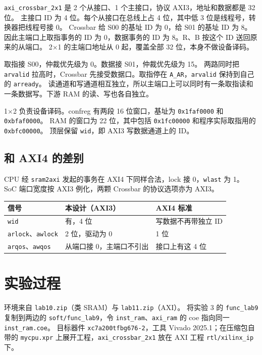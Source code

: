 \documentclass{article}
\begin{document}
\texttt{axi\_crossbar\_2x1} 是 2 个从接口、1 个主接口，协议 AXI3，地址和数据都是 32 位。
主接口 ID 为 4 位。每个从接口在总线上占 4 位，其中低 3 位是线程号，转换器把线程号接 0。
Crossbar 给 S00 的基址 ID 为 0，给 S01 的基址 ID 为 8。
因此主端口上取指事务的 ID 为 0，数据事务的 ID 为 8。R、B 按这个 ID 送回原来的从端口。
2$\times$1 的主端口地址从 0 起，覆盖全部 32 位，本身不做设备译码。

取指接 S00，仲裁优先级为 0。数据接 S01，仲裁优先级为 15。
两路同时把 \texttt{arvalid} 拉高时，Crossbar 先接受数据口。取指停在 \texttt{A\_AR}，\texttt{arvalid} 保持到自己的 \texttt{arready}。
读通道和写通道相互独立，所以主端口上可以同时有一条取指读和一条数据写。下游 RAM 的读、写也各自独立。

1$\times$2 负责设备译码。confreg 有两段 16 位窗口，基址为 \texttt{0x1faf0000} 和 \texttt{0xbfaf0000}。
RAM 的窗口为 22 位，其中包括 \texttt{0x1fc00000} 和程序实际取指用的 \texttt{0xbfc00000}。
顶层保留 \texttt{wid}，即 AXI3 写数据通道上的 ID。

\subsection{和 AXI4 的差别}
CPU 经 \texttt{sram2axi} 发起的事务在 AXI4 下同样合法，lock 接 0，\texttt{wlast} 为 1。
SoC 端口宽度按 AXI3 例化，两颗 Crossbar 的协议选项亦为 AXI3。

\begin{center}
\small
\begin{tabular}{@{}p{}p{}p{}@{}}
\toprule
信号 & 本设计（AXI3） & AXI4 标准 \\
\midrule
\texttt{wid} & 有，4 位 & 写数据不再带独立 ID \\
\texttt{arlock}、\texttt{awlock} & 2 位，驱动为 0 & 1 位 \\
\texttt{arqos}、\texttt{awqos} & 从端口接 0，主端口不引出 & 接口上有这 4 位 \\
\bottomrule
\end{tabular}
\end{center}

\section{实验过程}
环境来自 \texttt{lab10.zip}（类 SRAM）与 \texttt{lab11.zip}（AXI）。
将实验 3 的 \texttt{func\_lab9} 复制到两边的 \texttt{soft/func\_lab9}，令 \texttt{inst\_ram}、\texttt{axi\_ram} 的 coe 指向同一 \texttt{inst\_ram.coe}。
目标器件 \texttt{xc7a200tfbg676-2}，工具 Vivado 2025.1；在压缩包自带的 \texttt{mycpu.xpr} 上展开工程，\texttt{axi\_crossbar\_2x1} 放在 AXI 工程 \texttt{rtl/xilinx\_ip} 下。
\end{document}

